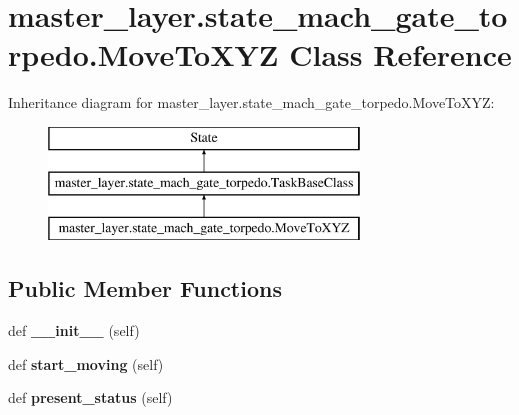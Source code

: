 \hypertarget{classmaster__layer_1_1state__mach__gate__torpedo_1_1MoveToXYZ}{}\section{master\+\_\+layer.\+state\+\_\+mach\+\_\+gate\+\_\+torpedo.\+Move\+To\+X\+YZ Class Reference}
\label{classmaster__layer_1_1state__mach__gate__torpedo_1_1MoveToXYZ}
Inheritance diagram for master\+\_\+layer.\+state\+\_\+mach\+\_\+gate\+\_\+torpedo.\+Move\+To\+X\+YZ\+:\begin{figure}[H]
\begin{center}
\leavevmode
\includegraphics[height=3.000000cm]{classmaster__layer_1_1state__mach__gate__torpedo_1_1MoveToXYZ}
\end{center}
\end{figure}
\subsection*{Public Member Functions}
\begin{DoxyCompactItemize}
\item 
\mbox{\label{classmaster__layer_1_1state__mach__gate__torpedo_1_1MoveToXYZ_a93923a104b3d70ded8df1652cc6f5d45}} 
def {\bfseries \+\_\+\+\_\+init\+\_\+\+\_\+} (self)
\item 
\mbox{\label{classmaster__layer_1_1state__mach__gate__torpedo_1_1MoveToXYZ_a4f53a928896b9b3e2105e7d99cddeb4d}} 
def {\bfseries start\+\_\+moving} (self)
\item 
\mbox{\label{classmaster__layer_1_1state__mach__gate__torpedo_1_1MoveToXYZ_a892f71e060bf7ea22b136ea8dabb2dc3}} 
def {\bfseries present\+\_\+status} (self)
\end{DoxyCompactItemize}
